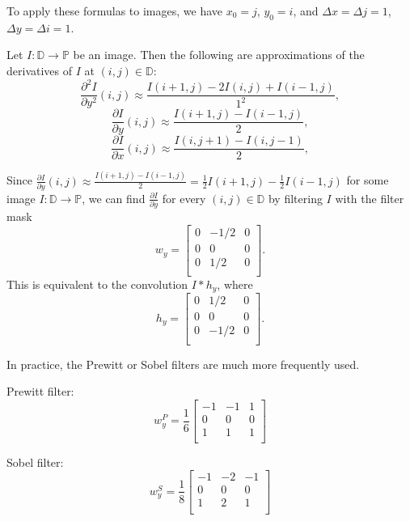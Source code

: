 \begin{rmk}
    To apply these formulas to images, we have $x_0 = j$, $y_0 = i$, and $\Delta x = \Delta j = 1$, $\Delta y = \Delta i = 1$.
\end{rmk}

\begin{exmp}
    Let $I: \mathbb{D} \to \mathbb{P}$ be an image. Then the following are approximations of the derivatives of $I$ at $(i, j) \in \mathbb{D}$:
    \[\frac{\partial^2I}{\partial y^2}(i, j) \approx \frac{I(i + 1, j) - 2I(i, j) + I(i - 1, j)}{1^2},\]
    \[\frac{\partial I}{\partial y}(i, j) \approx \frac{I(i + 1, j) - I(i - 1, j)}{2},\]
    \[\frac{\partial I}{\partial x}(i, j) \approx \frac{I(i, j + 1) - I(i, j - 1)}{2},\]
\end{exmp}

Since $\frac{\partial I}{\partial y}(i, j) \approx \frac{I(i + 1, j) - I(i - 1, j)}{2} = \frac{1}{2}I(i + 1, j) - \frac{1}{2}I(i - 1, j)$ for some image $I: \mathbb{D} \to \mathbb{P}$, we can find $\frac{\partial I}{\partial y}$ for every $(i, j) \in \mathbb{D}$ by filtering $I$ with the filter mask \[w_y = \begin{bmatrix}
    0 & -1/2 & 0 \\
    0 & 0 & 0 \\
    0 & 1/2 & 0 \\
\end{bmatrix}.\] This is equivalent to the convolution $I * h_y$, where \[h_y = \begin{bmatrix}
    0 & 1/2 & 0 \\
    0 & 0 & 0 \\
    0 & -1/2 & 0 \\
\end{bmatrix}.\]

In practice, the Prewitt or Sobel filters are much more frequently used.

Prewitt filter: \[w_y^P = \frac{1}{6}\begin{bmatrix}
    -1 & -1 & 1 \\
    0 & 0 & 0 \\
    1 & 1 & 1 \\
\end{bmatrix}\]

Sobel filter: \[w_y^S = \frac{1}{8}\begin{bmatrix}
    -1 & -2 & -1 \\
    0 & 0 & 0 \\
    1 & 2 & 1 \\
\end{bmatrix}\]

